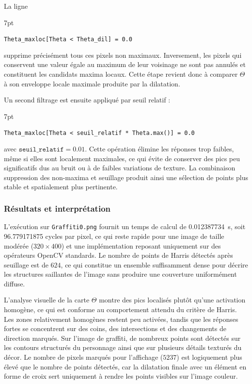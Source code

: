 \documentclass[11pt,a4paper]{article}
\newenvironment{formal}{%
\def\FrameCommand{%
  \hspace{1pt}%
  {\color{enstaBleuFonce}\vrule width 2pt}%
  {\color{formalshade}\vrule width 4pt}%
  \colorbox{formalshade}%
}%
\MakeFramed{\advance\hsize-\width\FrameRestore}%
\noindent\hspace{-4.55pt}%
\begin{adjustwidth}{}{7pt}%
\vspace{4pt}%
}{%
\vspace{4pt}\end{adjustwidth}\endMakeFramed%
}
\begin{document}
La ligne
\begin{formal}
\texttt{Theta\_maxloc[Theta < Theta\_dil] = 0.0}
\end{formal}
supprime précisément tous ces pixels non maximaux. Inversement, les pixels qui conservent une valeur égale au maximum de leur voisinage ne sont pas annulés et constituent les candidats maxima locaux. Cette étape revient donc à comparer \(\Theta\) à son enveloppe locale maximale produite par la dilatation.

Un second filtrage est ensuite appliqué par seuil relatif :
\begin{formal}
\texttt{Theta\_maxloc[Theta < seuil\_relatif * Theta.max()] = 0.0}
\end{formal}
avec \(\texttt{seuil\_relatif}=0.01\). Cette opération élimine les réponses trop faibles, même si elles sont localement maximales, ce qui évite de conserver des pics peu significatifs dus au bruit ou à de faibles variations de texture. La combinaison suppression des non-maxima et seuillage produit ainsi une sélection de points plus stable et spatialement plus pertinente.

\subsubsection{Résultats et interprétation}
L'exécution sur \texttt{Graffiti0.png} fournit un temps de calcul de \SI{0.012387734}{s}, soit \num{96.779171875} cycles par pixel, ce qui reste rapide pour une image de taille modérée (\(320 \times 400\)) et une implémentation reposant uniquement sur des opérateurs OpenCV standards. Le nombre de points de Harris détectés après seuillage est de \(624\), ce qui constitue un ensemble suffisamment dense pour décrire les structures saillantes de l'image sans produire une couverture uniformément diffuse.

L'analyse visuelle de la carte \(\Theta\) montre des pics localisés plutôt qu'une activation homogène, ce qui est conforme au comportement attendu du critère de Harris. Les zones relativement homogènes restent peu activées, tandis que les réponses fortes se concentrent sur des coins, des intersections et des changements de direction marqués. Sur l'image de graffiti, de nombreux points sont détectés sur les contours structurés du personnage ainsi que sur plusieurs détails texturés du décor. Le nombre de pixels marqués pour l'affichage (\(5237\)) est logiquement plus élevé que le nombre de points détectés, car la dilatation finale avec un élément en forme de croix sert uniquement à rendre les points visibles sur l'image couleur.
\end{document}
